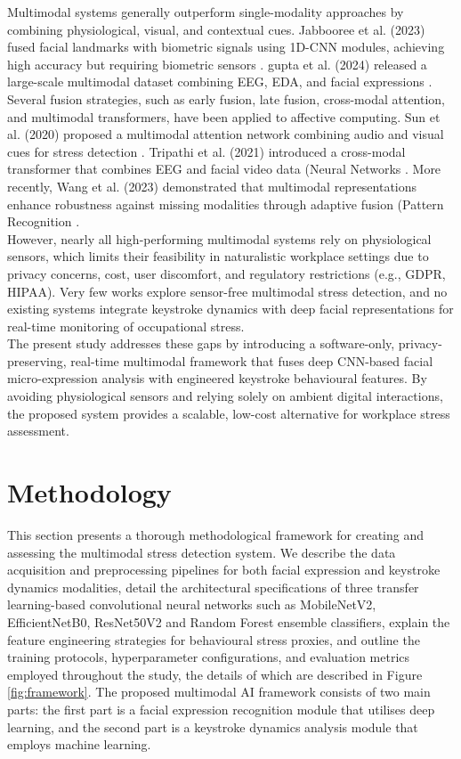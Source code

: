 \documentclass[fleqn,10pt]{wlscirep}
\begin{document}
Multimodal systems generally outperform single-modality approaches by combining physiological, visual, and contextual cues. Jabbooree et al. (2023) fused facial landmarks with biometric signals using 1D-CNN modules, achieving high accuracy but requiring biometric sensors \cite{24jabbooree2023novel}. gupta et al. (2024) released a large-scale multimodal dataset combining EEG, EDA, and facial expressions \cite{25gupta2025}.
Several fusion strategies, such as early fusion, late fusion, cross-modal attention, and multimodal transformers, have been applied to affective computing. Sun et al. (2020) proposed a multimodal attention network combining audio and visual cues for stress detection \cite{sun2020}. Tripathi et al. (2021) introduced a cross-modal transformer that combines EEG and facial video data (Neural Networks \cite{tripathi2021}. More recently, Wang et al. (2023) demonstrated that multimodal representations enhance robustness against missing modalities through adaptive fusion (Pattern Recognition \cite{wang2023}.\\
However, nearly all high-performing multimodal systems rely on physiological sensors, which limits their feasibility in naturalistic workplace settings due to privacy concerns, cost, user discomfort, and regulatory restrictions (e.g., GDPR, HIPAA). Very few works explore sensor-free multimodal stress detection, and no existing systems integrate keystroke dynamics with deep facial representations for real-time monitoring of occupational stress.\\
The present study addresses these gaps by introducing a software-only, privacy-preserving, real-time multimodal framework that fuses deep CNN-based facial micro-expression analysis with engineered keystroke behavioural features. By avoiding physiological sensors and relying solely on ambient digital interactions, the proposed system provides a scalable, low-cost alternative for workplace stress assessment.




\section*{Methodology}
This section presents a thorough methodological framework for creating and assessing the multimodal stress detection system. We describe the data acquisition and preprocessing pipelines for both facial expression and keystroke dynamics modalities, detail the architectural specifications of three transfer learning-based convolutional neural networks such as MobileNetV2, EfficientNetB0, ResNet50V2 and Random Forest ensemble classifiers, explain the feature engineering strategies for behavioural stress proxies, and outline the training protocols, hyperparameter configurations, and evaluation metrics employed throughout the study, the details of which are described in Figure \ref{fig:framework}. The proposed multimodal AI framework consists of two main parts: the first part is a facial expression recognition module that utilises deep learning, and the second part is a keystroke dynamics analysis module that employs machine learning.
\end{document}
